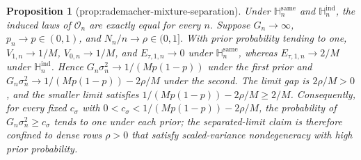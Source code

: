 \documentclass{article}
\newtheorem{proposition}{Proposition}
\begin{document}
\begin{proposition}[prop:rademacher-mixture-separation]\label{prop:rademacher-mixture-separation}
Under \(\mathbb H_n^{\mathrm{same}}\) and \(\mathbb H_n^{\mathrm{ind}}\), the induced laws of \(\mathcal O_n\) are exactly equal for every \(n\). Suppose \(G_n\to\infty\), \(p_n\to p\in(0,1)\), and \(N_n/n\to\rho\in(0,1]\). With prior probability tending to one, \(V_{1,n}\to1/M\), \(V_{0,n}\to1/M\), and \(E_{\tau,1,n}\to0\) under \(\mathbb H_n^{\mathrm{same}}\), whereas \(E_{\tau,1,n}\to2/M\) under \(\mathbb H_n^{\mathrm{ind}}\). Hence \(G_n\sigma_n^2\to1/(Mp(1-p))\) under the first prior and \(G_n\sigma_n^2\to1/(Mp(1-p))-2\rho/M\) under the second. The limit gap is \(2\rho/M>0\), and the smaller limit satisfies \(1/(Mp(1-p))-2\rho/M\ge2/M\). Consequently, for every fixed \(c_\sigma\) with \(0<c_\sigma<1/(Mp(1-p))-2\rho/M\), the probability of \(G_n\sigma_n^2\ge c_\sigma\) tends to one under each prior; the separated-limit claim is therefore confined to dense rows \(\rho>0\) that satisfy scaled-variance nondegeneracy with high prior probability.
\end{proposition}
\end{document}
